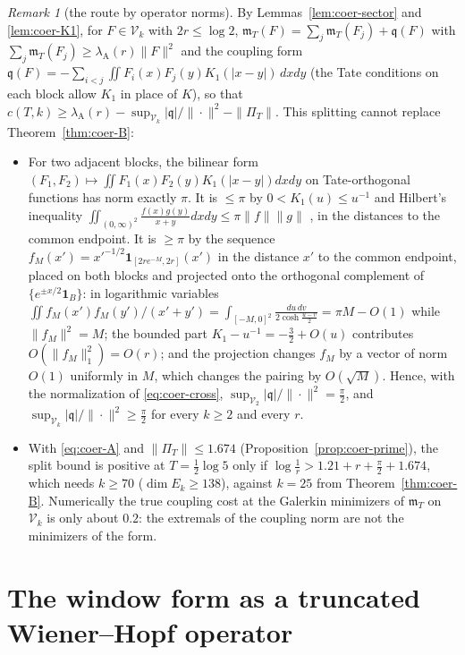 \documentclass[11pt]{amsart}
\theoremstyle{definition}
\theoremstyle{remark}
\newtheorem{remark}[theorem]{Remark}
\newcommand{\PiT}{\Pi_T}
\newcommand{\mT}{\mathfrak m_T}
\begin{document}
\begin{remark}[the route by operator norms]\label{rem:coer-nogo}
By Lemmas~\ref{lem:coer-sector} and \ref{lem:coer-K1}, for $F\in\mathcal V_k$ with $2r\le\log2$,
$\mT(F)=\sum_j\mT(F_j)+\mathfrak q(F)$ with $\sum_j\mT(F_j)\ge\lambda_{\mathrm A}(r)\|F\|^2$ and the coupling form
$\mathfrak q(F)=-\sum_{i<j}\iint F_i(x)F_j(y)K_1(|x-y|)\,dxdy$ (the Tate conditions on each block allow $K_1$ in place of $K$),
so that $c(T,k)\ge\lambda_{\mathrm A}(r)-\sup_{\mathcal V_k}|\mathfrak q|/\|\cdot\|^2-\|\PiT\|$. This splitting cannot replace
Theorem~\ref{thm:coer-B}:
\begin{itemize}
\item[(a)] For two adjacent blocks, the bilinear form $(F_1,F_2)\mapsto\iint F_1(x)F_2(y)K_1(|x-y|)dxdy$ on Tate-orthogonal
functions has norm exactly $\pi$. It is $\le\pi$ by $0<K_1(u)\le u^{-1}$ and Hilbert's inequality
$\iint_{(0,\infty)^2}\frac{f(x)g(y)}{x+y}dxdy\le\pi\|f\|\|g\|$ \cite[Thm.~316]{HLP}, in the distances to the common endpoint. It is
$\ge\pi$ by the sequence $f_M(x')=x'^{-1/2}\mathbf 1_{[2re^{-M},2r]}(x')$ in the distance $x'$ to the common endpoint, placed on
both blocks and projected onto the orthogonal complement of $\{e^{\pm x/2}\mathbf 1_B\}$: in logarithmic variables
$\iint f_M(x')f_M(y')/(x'+y')=\int_{[-M,0]^2}\frac{du\,dv}{2\cosh\frac{u-v}2}=\pi M-O(1)$ while $\|f_M\|^2=M$; the bounded part
$K_1-u^{-1}=-\frac32+O(u)$ contributes $O(\|f_M\|_1^2)=O(r)$; and the projection changes $f_M$ by a vector of norm $O(1)$
uniformly in $M$, which changes the pairing by $O(\sqrt M)$. Hence, with the normalization of \eqref{eq:coer-cross},
$\sup_{\mathcal V_2}|\mathfrak q|/\|\cdot\|^2=\frac\pi2$, and $\sup_{\mathcal V_k}|\mathfrak q|/\|\cdot\|^2\ge\frac\pi2$ for every $k\ge2$ and every
$r$.
\item[(b)] With \eqref{eq:coer-A} and $\|\PiT\|\le1.674$ (Proposition~\ref{prop:coer-prime}), the split bound is positive at
$T=\frac12\log5$ only if $\log\frac1r>1.21+r+\frac\pi2+1.674$, which needs $k\ge70$ ($\dim E_k\ge138$), against $k=25$ from
Theorem~\ref{thm:coer-B}. Numerically the true coupling cost at the Galerkin minimizers of $\mT$ on $\mathcal V_k$ is only
about $0.2$: the extremals of the coupling norm are not the minimizers of the form.
\end{itemize}
\end{remark}


\section{The window form as a truncated Wiener--Hopf operator}\label{sec:wh}
\end{document}
